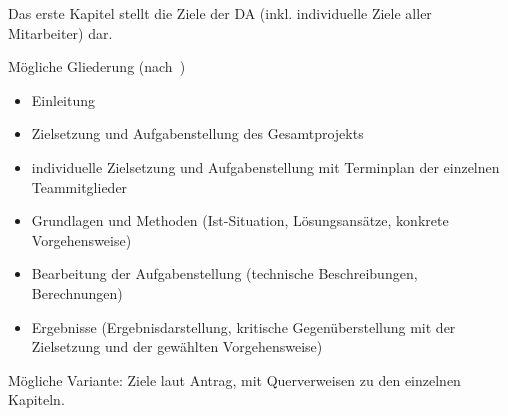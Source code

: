 \documentclass[
    headings=optiontotocandhead,%
    twoside,
    numbers=noenddot,%
    toc=flat, %
    12pt, %
    titlepage, %
    parskip=full, %
    listof=totoc, %
    listof=flat, %
    numbers=noenddot, %
    bibliography=totoc, %
    a4paper,DIV=14,
    BCOR=15mm,
]{scrbook}
\begin{document}
Das erste Kapitel stellt die Ziele der DA (inkl. individuelle Ziele
aller Mitarbeiter) dar.

Mögliche Gliederung (nach~\cite{leitfaden})

\begin{itemize}
\item  Einleitung
\item   Zielsetzung und Aufgabenstellung des Gesamtprojekts
\item   individuelle Zielsetzung und Aufgabenstellung mit Terminplan der einzelnen Teammitglieder
\item   Grundlagen und Methoden (Ist-Situation, Lösungsansätze, konkrete Vorgehensweise)
\item   Bearbeitung der Aufgabenstellung (technische Beschreibungen, Berechnungen)
\item   Ergebnisse (Ergebnisdarstellung, kritische Gegenüberstellung mit der Zielsetzung
 und der gewählten Vorgehensweise)
\end{itemize}

Mögliche Variante: Ziele laut Antrag, mit Querverweisen zu den einzelnen Kapiteln.

%
%
%
%
%
%
%

%

\appendix



%


\end{document}
